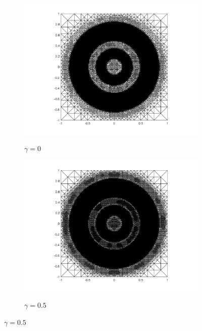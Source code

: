 \begin{figure}[p]
  \centering
  \begin{subfigure}{.32\linewidth}
    \centering
    \caption{$\gamma=0$}
    \includegraphics[trim = 100 30 80 20, clip, width=\linewidth]
      {pictures/chapExperiments/secExactSol/parGamma/0/lvl14/triangulation.png}
    \label{fig:gamma0Triang}
  \end{subfigure}
  \begin{subfigure}{.32\linewidth}
    \centering
    \caption{$\gamma=0.5$}
    \includegraphics[trim = 100 30 80 20, clip, width=\linewidth]
      {pictures/chapExperiments/secExactSol/parGamma/5em1/lvl14/triangulation.png}
    \label{fig:gammaDot5Triang}
  \end{subfigure}

\end{figure}
